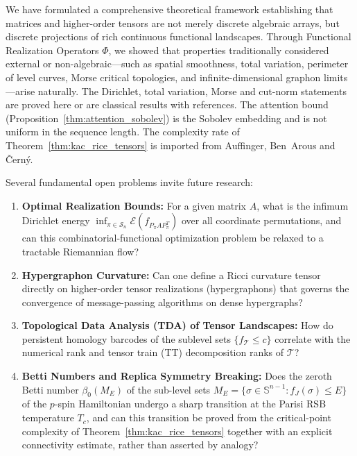 \documentclass[11pt,a4paper,reqno]{amsart}
\theoremstyle{definition}
\numberwithin{equation}{section}
\providecommand{\Sph}{\mathbb{S}}
\begin{document}
We have formulated a comprehensive theoretical framework establishing that matrices and higher-order tensors are not merely discrete algebraic arrays, but discrete projections of rich continuous functional landscapes. Through Functional Realization Operators $\Phi$, we showed that properties traditionally considered external or non-algebraic---such as spatial smoothness, total variation, perimeter of level curves, Morse critical topologies, and infinite-dimensional graphon limits---arise naturally. The Dirichlet, total variation, Morse and cut-norm statements are proved here or are classical results with references. The attention bound (Proposition~\ref{thm:attention_sobolev}) is the Sobolev embedding and is not uniform in the sequence length. The complexity rate of Theorem~\ref{thm:kac_rice_tensors} is imported from Auffinger, Ben~Arous and \v{C}ern\'y.

Several fundamental open problems invite future research:
\begin{enumerate}
    \item \textbf{Optimal Realization Bounds:} For a given matrix $A$, what is the infimum Dirichlet energy $\inf_{\pi \in \mathcal{S}_n} \mathcal{E}(f_{P_\pi A P_\pi^T})$ over all coordinate permutations, and can this combinatorial-functional optimization problem be relaxed to a tractable Riemannian flow?
    \item \textbf{Hypergraphon Curvature:} Can one define a Ricci curvature tensor directly on higher-order tensor realizations (hypergraphons) that governs the convergence of message-passing algorithms on dense hypergraphs?
    \item \textbf{Topological Data Analysis (TDA) of Tensor Landscapes:} How do persistent homology barcodes of the sublevel sets $\{f_{\mathcal{T}} \le c\}$ correlate with the numerical rank and tensor train (TT) decomposition ranks of $\mathcal{T}$?
    \item \textbf{Betti Numbers and Replica Symmetry Breaking:} Does the zeroth Betti number $\beta_0(M_E)$ of the sub-level sets $M_E = \{\sigma \in \Sph^{n-1} \colon f_J(\sigma) \le E\}$ of the $p$-spin Hamiltonian undergo a sharp transition at the Parisi RSB temperature $T_c$, and can this transition be proved from the critical-point complexity of Theorem~\ref{thm:kac_rice_tensors} together with an explicit connectivity estimate, rather than asserted by analogy?
\end{enumerate}


\end{document}
